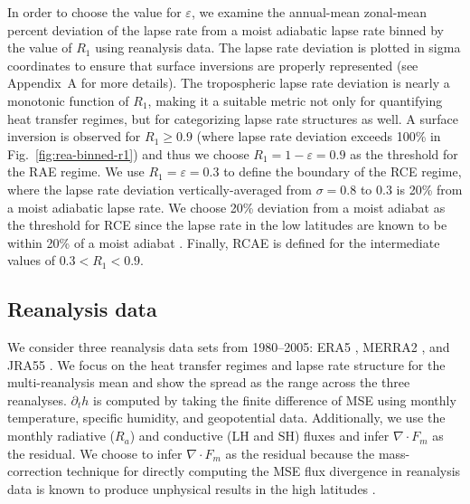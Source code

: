 \documentclass{ametsocV5}
\begin{document}
    In order to choose the value for $\varepsilon$, we examine the annual-mean zonal-mean percent deviation of the lapse rate from a moist adiabatic lapse rate binned by the value of $R_1$ using reanalysis data. The lapse rate deviation is plotted in sigma coordinates to ensure that surface inversions are properly represented (see Appendix~A for more details). The tropospheric lapse rate deviation is nearly a monotonic function of $R_1$, making it a suitable metric not only for quantifying heat transfer regimes, but for categorizing lapse rate structures as well. A surface inversion is observed for $R_1 \ge 0.9$ (where lapse rate deviation exceeds 100\% in Fig.~\ref{fig:rea-binned-r1}) and thus we choose $R_1=1-\varepsilon=0.9$ as the threshold for the RAE regime. We use $R_1=\varepsilon=0.3$ to define the boundary of the RCE regime, where the lapse rate deviation vertically-averaged from $\sigma=0.8$ to 0.3 is 20\% from a moist adiabatic lapse rate. We choose 20\% deviation from a moist adiabat as the threshold for RCE since the lapse rate in the low latitudes are known to be within 20\% of a moist adiabat \citep{stone1979}. Finally, RCAE is defined for the intermediate values of $0.3<R_1<0.9$.
    
    \subsection{Reanalysis data}\label{subsec:reanalysis}
    
    We consider three reanalysis data sets from 1980--2005: ERA5 \citep{hersbach2020}, MERRA2 \citep{gelaro2017}, and JRA55 \citep{kobayashi2015}. We focus on the heat transfer regimes and lapse rate structure for the multi-reanalysis mean and show the spread as the range across the three reanalyses. $\partial_t h$ is computed by taking the finite difference of MSE using monthly temperature, specific humidity, and geopotential data. Additionally, we use the monthly radiative ($R_a$) and conductive ($\mathrm{LH}$ and $\mathrm{SH}$) fluxes and infer $\nabla\cdot F_m$ as the residual. We choose to infer $\nabla\cdot F_m$ as the residual because the mass-correction technique for directly computing the MSE flux divergence in reanalysis data is known to produce unphysical results in the high latitudes \citep{porter2010}. 
    
\end{document}
